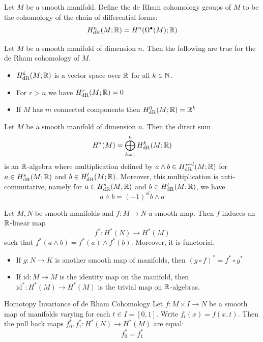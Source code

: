 \documentclass[a4paper]{article}
\begin{document}
\begin{defn}{}{} Let $M$ be a smooth manifold. Define the de Rham cohomology groups of $M$ to be the cohomology of the chain of differential forms: $$H_{\text{dR}}^n(M;\mathbb{R})=H^n(\Omega^\bullet(M);\mathbb{R})$$
\end{defn}

\begin{prp}{}{} Let $M$ be a smooth manifold of dimension $n$. Then the following are true for the de Rham cohomology of $M$. 
\begin{itemize}
\item $H_{\text{dR}}^k(M;\mathbb{R})$ is a vector space over $\mathbb{R}$ for all $k\in\mathbb{N}$. 
\item For $r>n$ we have $H_{\text{dR}}^r(M;\mathbb{R})=0$
\item If $M$ has $m$ connected components then $H_{\text{dR}}^0(M;\mathbb{R})=\mathbb{R}^k$
\end{itemize}
\end{prp}

\begin{thm}{}{} Let $M$ be a smooth manifold of dimension $n$. Then the direct sum $$H^\ast(M)=\bigoplus_{k=1}^nH_{\text{dR}}^k(M;\mathbb{R})$$ is an $\mathbb{R}$-algebra where multiplication defined by $a\wedge b\in H_{\text{dR}}^{s+l}(M;\mathbb{R})$ for $a\in H_{\text{dR}}^s(M;\mathbb{R})$ and $b\in H_{\text{dR}}^l(M;\mathbb{R})$. Moreover, this multiplication is anti-commutative, namely for $a\in H_{\text{dR}}^s(M;\mathbb{R})$ and $b\in H_{\text{dR}}^l(M;\mathbb{R})$, we have $$a\wedge b=(-1)^{sl}b\wedge a$$
\end{thm}

\begin{prp}{}{} Let $M,N$ be smooth manifolds and $f:M\to N$ a smooth map. Then $f$ induces an $\mathbb{R}$-linear map $$f^\ast:H^\ast(N)\to H^\ast(M)$$ such that $f^\ast(a\wedge b)=f^\ast(a)\wedge f^\ast(b)$. Moreover, it is functorial: 
\begin{itemize}
\item If $g:N\to K$ is another smooth map of manifolds, then $(g\circ f)^\ast=f^\ast\circ g^\ast$
\item If $\text{id}:M\to M$ is the identity map on the manifold, then $\text{id}^\ast:H^\ast(M)\to H^\ast(M)$ is the trivial map on $\mathbb{R}$-algebras. 
\end{itemize}
\end{prp}

\begin{thm}{Homotopy Invariance of de Rham Cohomology}{} Let $f:M\times I\to N$ be a smooth map of manifolds varying for each $t\in I=[0,1]$. Write $f_t(x)=f(x,t)$. Then the pull back maps $f_0^\ast,f_1^\ast:H^\ast(N)\to H^\ast(M)$ are equal: $$f_0^\ast=f_1^\ast$$
\end{thm}
\end{document}
